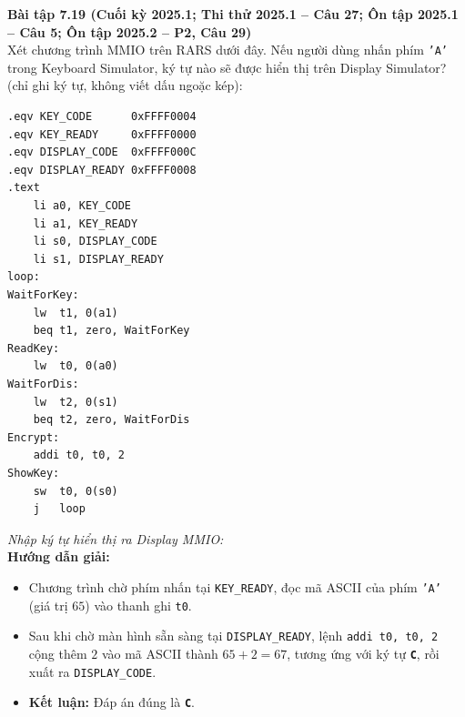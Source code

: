 \textbf{Bài tập 7.19 (Cuối kỳ 2025.1; Thi thử 2025.1 -- Câu 27; Ôn tập 2025.1 -- Câu 5; Ôn tập 2025.2 -- P2, Câu 29)}\\
Xét chương trình MMIO trên RARS dưới đây. Nếu người dùng nhấn phím \texttt{'A'} trong Keyboard Simulator, ký tự nào sẽ được hiển thị trên Display Simulator? (chỉ ghi ký tự, không viết dấu ngoặc kép):
\begin{lstlisting}
.eqv KEY_CODE      0xFFFF0004
.eqv KEY_READY     0xFFFF0000
.eqv DISPLAY_CODE  0xFFFF000C
.eqv DISPLAY_READY 0xFFFF0008
.text
    li a0, KEY_CODE
    li a1, KEY_READY
    li s0, DISPLAY_CODE
    li s1, DISPLAY_READY
loop:
WaitForKey:
    lw  t1, 0(a1)
    beq t1, zero, WaitForKey
ReadKey:
    lw  t0, 0(a0)
WaitForDis:
    lw  t2, 0(s1)
    beq t2, zero, WaitForDis
Encrypt:
    addi t0, t0, 2
ShowKey:
    sw  t0, 0(s0)
    j   loop
\end{lstlisting}
\textit{Nhập ký tự hiển thị ra Display MMIO:} \underline{\hspace{2.5cm}}\\[4pt]
\textbf{Hướng dẫn giải:}
\begin{itemize}
    \item Chương trình chờ phím nhấn tại \texttt{KEY\_READY}, đọc mã ASCII của phím \texttt{'A'} (giá trị $65$) vào thanh ghi \texttt{t0}.
    \item Sau khi chờ màn hình sẵn sàng tại \texttt{DISPLAY\_READY}, lệnh \texttt{addi t0, t0, 2} cộng thêm $2$ vào mã ASCII thành $65 + 2 = 67$, tương ứng với ký tự \textbf{\texttt{C}}, rồi xuất ra \texttt{DISPLAY\_CODE}.
    \item \textbf{Kết luận:} Đáp án đúng là \textbf{\texttt{C}}.
\end{itemize}

